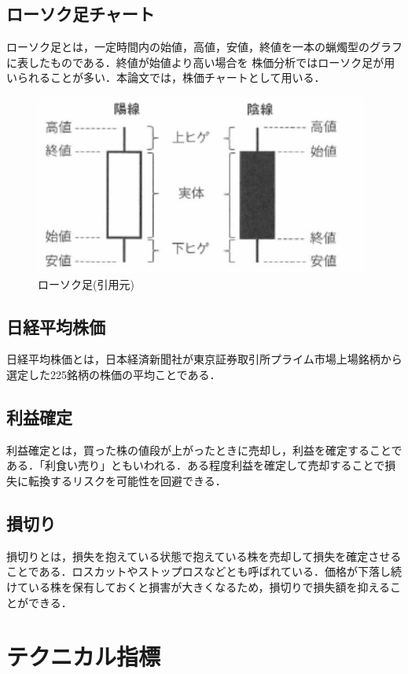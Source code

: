 \subsection{ローソク足チャート}
ローソク足とは，一定時間内の始値，高値，安値，終値を一本の蝋燭型のグラフに表したものである．終値が始値より高い場合を
株価分析ではローソク足が用いられることが多い．本論文では，株価チャートとして用いる\cite{pythontrading}．

\begin{figure}[H]
  \centering
  \includegraphics[width=110mm]{fig/candle.png}
  \caption{ローソク足(引用元\cite{pythontrading})}
  \label{fig:candle}
 \end{figure}

 \subsection{日経平均株価}
日経平均株価とは，日本経済新聞社が東京証券取引所プライム市場上場銘柄から選定した225銘柄の株価の平均ことである\cite{nikkei_kabu}．

 \subsection{利益確定}
 利益確定とは，買った株の値段が上がったときに売却し，利益を確定することである．「利食い売り」ともいわれる．ある程度利益を確定して売却することで損失に転換するリスクを可能性を回避できる\cite{rikaku}．
 \subsection{損切り}
損切りとは，損失を抱えている状態で抱えている株を売却して損失を確定させることである．ロスカットやストップロスなどとも呼ばれている．価格が下落し続けている株を保有しておくと損害が大きくなるため，損切りで損失額を抑えることができる\cite{songiri}．
\section{テクニカル指標}
